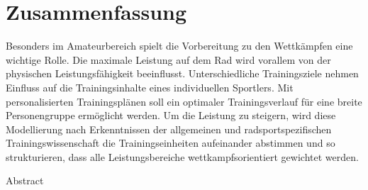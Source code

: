 \chapter*{Zusammenfassung}
\label{sec:abstract}
\vspace*{-10mm}
Besonders im Amateurbereich spielt die Vorbereitung zu den Wettkämpfen eine wichtige Rolle. Die maximale Leistung auf dem Rad wird vorallem von der physischen Leistungsfähigkeit beeinflusst. Unterschiedliche Trainingsziele nehmen Einfluss auf die Trainingsinhalte eines individuellen Sportlers. Mit personalisierten Trainingsplänen soll ein optimaler Trainingsverlauf für eine breite Personengruppe ermöglicht werden.
Um die Leistung zu steigern, wird diese Modellierung nach Erkenntnissen der allgemeinen und radsportspezifischen Trainingswissenschaft die Trainingseinheiten aufeinander abstimmen und so strukturieren, dass alle Leistungsbereiche wettkampfsorientiert gewichtet werden.
\vspace*{20mm}

{Abstract}\label{sec:abstract-diff} \\
\vspace*{-10mm}
